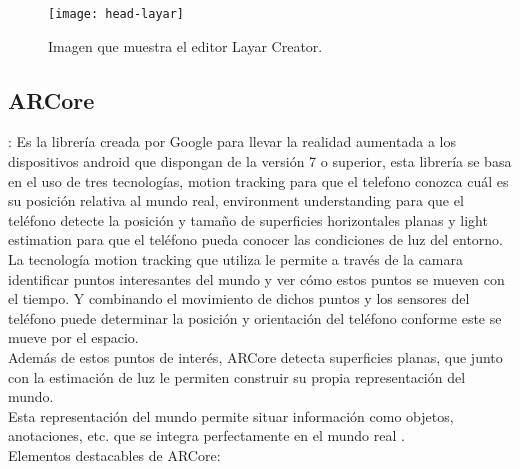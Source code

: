 \begin{itemize}
\begin{itemize}
\begin{figure}[h]
  \centering
  \texttt{[image: head-layar]}
  \caption{Imagen que muestra el editor Layar Creator.\protect\footnotemark}
  \label{figura-layar}
\end{figure}


\subsection{ARCore}: Es la librería creada por Google para llevar la realidad aumentada a los dispositivos android que dispongan de la versión 7 o superior, esta librería se basa en el uso de tres tecnologías, motion tracking para que el telefono conozca cuál es su posición relativa al mundo real, environment understanding para que el teléfono detecte la posición y tamaño de superficies horizontales planas y light estimation para que el teléfono pueda conocer las condiciones de luz del entorno.\\

La tecnología motion tracking que utiliza le permite a través de la camara identificar puntos interesantes del mundo y ver cómo estos puntos se mueven con el tiempo. Y combinando el movimiento de dichos puntos y los sensores del teléfono puede determinar la posición y orientación del teléfono conforme este se mueve por el espacio.\\

Además de estos puntos de interés, ARCore detecta superficies planas, que junto con la estimación de luz le permiten construir su propia representación del mundo.\\

Esta representación del mundo permite situar información como objetos, anotaciones, etc. que se integra perfectamente en el mundo real \cite{arcore}.\\

Elementos destacables de ARCore:


\end{itemize}
\end{itemize}

